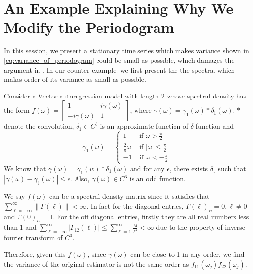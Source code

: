 \section{An Example Explaining Why We Modify the Periodogram}
\label{sec:counter_example}
In this session, we present a stationary time series which makes variance shown in \eqref{eq:variance_of_periodogram} could be small as possible, which damages the argument in \cite{cai2011adaptive}. In our counter example, we first present the the spectral which makes order of its variance as small as possible. 


Consider a Vector autoregression   model with length 2 whose spectral density has the form
$f(\omega)=\begin{bmatrix}1&i\gamma(\omega)\\ -i\gamma(\omega)&1 \end{bmatrix}$, where $\gamma(\omega)=\gamma_1(\omega)*\delta_1(\omega)$, $*$ denote the convolution, $\delta_1\in C^3$ is an approximate function of $\delta$-function and  $$\gamma_1(\omega)= \begin{cases}
1 & \mbox{ if } \omega >\frac{\pi}{2}\\
\frac{2}{\pi}\omega & \mbox{ if } |\omega| \leq \frac{\pi}{2} \\
-1& \mbox{ if } \omega <-\frac{\pi}{2}
\end{cases}
$$ 
We know that $\gamma(\omega)=\gamma_1(w)*\delta_1(\omega)$ and for any $\epsilon$, there exists $\delta_1$ such that $|\gamma(\omega)-\gamma_1(\omega)|\leq \epsilon$.
Also, $\gamma (\omega)\in C^3$ is an odd function.  

We say $f(\omega)$ can be a spectral density matrix since it satisfies 
that  $\sum_{\ell=-\infty}^\infty \|\Gamma(\ell)\|<\infty$. In fact for the diagonal entries, $\Gamma(\ell)_{ii}=0,\ell \neq 0$ and  $\Gamma(0)_{ii}=1$. For the off diagonal entries, firstly they are all real numbers less than 1 and $\sum_{\ell=-\infty}^\infty |\Gamma_{12}(\ell)|\leq \sum_{\ell=1}^\infty \frac{M}{\ell^3}<\infty$ due to the property of inverse fourier transform of $C^3$.\par
Therefore, given this $f(\omega)$, since $\gamma(\omega)$ can be close to 1 in any order, we find the variance of the original estimator is not the same order as $f_{11}(\omega_j)f_{22}(\omega_j)$.
